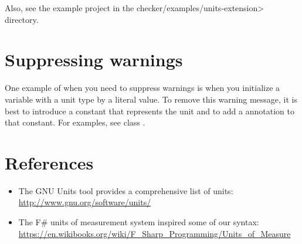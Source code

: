 Also, see the example project in the \<checker/examples/units-extension> directory.



\section{Suppressing warnings\label{units-suppressing}}

One example of when you need to suppress warnings is when you initialize a
variable with a unit type by a literal value. To remove this warning message,
it is best to introduce a constant that represents the unit and to add a
 annotation to that constant.
For examples, see class .



\section{References\label{units-references}}

\begin{itemize}
\item The GNU Units tool provides a comprehensive list of units:\\
  \url{http://www.gnu.org/software/units/}

\item The F\# units of measurement system inspired some of our syntax:\\
  \url{https://en.wikibooks.org/wiki/F_Sharp_Programming/Units_of_Measure}

\end{itemize}

